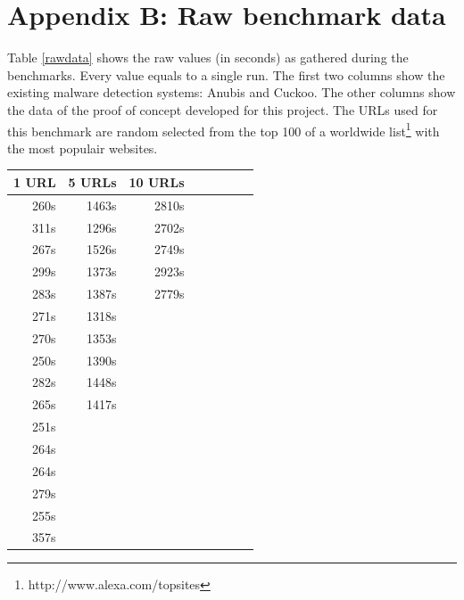 \documentclass{scrartcl}
\begin{document}
\clearpage

\section*{Appendix B: Raw benchmark data}

Table \ref{rawdata} shows the raw values (in seconds) as gathered during the benchmarks. Every value equals to a single run. The first two columns show the existing malware detection systems: Anubis and Cuckoo. The other columns show the data of the proof of concept developed for this project. The URLs used for this benchmark are random selected from the top 100 of a worldwide list\footnote{http://www.alexa.com/topsites} with the most populair websites.

\begin{table}[h]
\center
\begin{tabular}{@{}llllllll@{}}
\toprule
1 URL       & 5 URLs      & 10 URLs    \\ \midrule
\multicolumn{1}{r}{260s} & \multicolumn{1}{r}{1463s} & \multicolumn{1}{r}{2810s} \\
\multicolumn{1}{r}{311s} & \multicolumn{1}{r}{1296s} & \multicolumn{1}{r}{2702s} \\
\multicolumn{1}{r}{267s} & \multicolumn{1}{r}{1526s} & \multicolumn{1}{r}{2749s} \\
\multicolumn{1}{r}{299s} & \multicolumn{1}{r}{1373s} & \multicolumn{1}{r}{2923s} \\
\multicolumn{1}{r}{283s} & \multicolumn{1}{r}{1387s} & \multicolumn{1}{r}{2779s} \\
\multicolumn{1}{r}{271s} & \multicolumn{1}{r}{1318s} & \\
\multicolumn{1}{r}{270s} & \multicolumn{1}{r}{1353s} & \\
\multicolumn{1}{r}{250s} & \multicolumn{1}{r}{1390s} & \\
\multicolumn{1}{r}{282s} & \multicolumn{1}{r}{1448s} & \\
\multicolumn{1}{r}{265s} & \multicolumn{1}{r}{1417s} & \\
\multicolumn{1}{r}{251s} &  & \\
\multicolumn{1}{r}{264s} &  & \\
\multicolumn{1}{r}{264s} &  & \\
\multicolumn{1}{r}{279s} &  & \\
\multicolumn{1}{r}{255s} &  & \\
\multicolumn{1}{r}{357s} &  & \\

\end{tabular}
\end{table}
\end{document}
